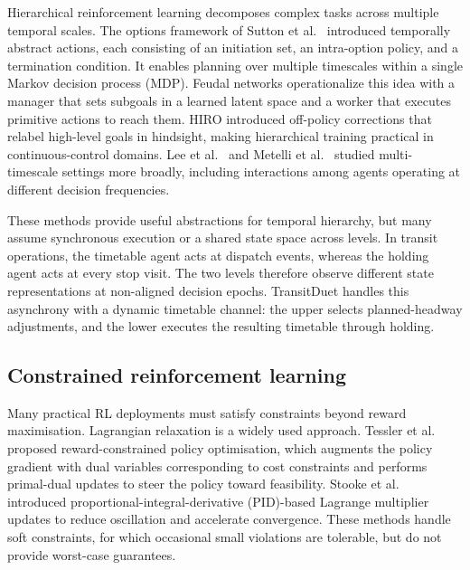 Hierarchical reinforcement learning decomposes complex tasks across multiple temporal scales. The options framework of Sutton et al.~\citep{sutton1999between} introduced temporally abstract actions, each consisting of an initiation set, an intra-option policy, and a termination condition. It enables planning over multiple timescales within a single Markov decision process (MDP). Feudal networks \citep{vezhnevets2017feudal} operationalize this idea with a manager that sets subgoals in a learned latent space and a worker that executes primitive actions to reach them. HIRO \citep{nachum2018data} introduced off-policy corrections that relabel high-level goals in hindsight, making hierarchical training practical in continuous-control domains. Lee et al.~\citep{lee2020reinforcement} and Metelli et al.~\citep{metelli2020control} studied multi-timescale settings more broadly, including interactions among agents operating at different decision frequencies.

These methods provide useful abstractions for temporal hierarchy, but many assume synchronous execution or a shared state space across levels. In transit operations, the timetable agent acts at dispatch events, whereas the holding agent acts at every stop visit. The two levels therefore observe different state representations at non-aligned decision epochs. TransitDuet handles this asynchrony with a dynamic timetable channel: the upper selects planned-headway adjustments, and the lower executes the resulting timetable through holding.

\subsection{Constrained reinforcement learning}
\label{subsec:constrained_rl}

Many practical RL deployments must satisfy constraints beyond reward maximisation. Lagrangian relaxation is a widely used approach. Tessler et al.~\citep{tessler2019reward} proposed reward-constrained policy optimisation, which augments the policy gradient with dual variables corresponding to cost constraints and performs primal-dual updates to steer the policy toward feasibility. Stooke et al.~\citep{stooke2020responsive} introduced proportional-integral-derivative (PID)-based Lagrange multiplier updates to reduce oscillation and accelerate convergence. These methods handle soft constraints, for which occasional small violations are tolerable, but do not provide worst-case guarantees.

